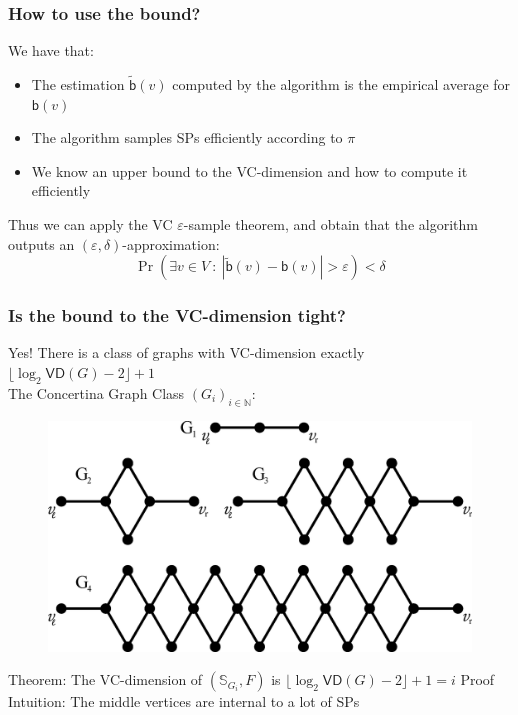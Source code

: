\documentclass[aspectratio=169]{beamer}
\newcommand*{\prob}{\pi\xspace}
\newcommand*{\betw}{\ensuremath{\mathsf{b}}\xspace}
\begin{document}
\begin{frame}
  \frametitle{How to use the bound?}
  We have that:
  \begin{itemize}
    \item The estimation $\tilde{\betw}(v)$ computed by the algorithm is the
      empirical average for $\betw(v)$
    \item The algorithm samples SPs efficiently according to $\prob$
    \item We know an upper bound to the VC-dimension and how to compute it
      efficiently
  \end{itemize}
  Thus we can apply the VC $\varepsilon$-sample theorem, and obtain that the algorithm
  outputs an $(\varepsilon,\delta)$-approximation:
  \[
    \Pr(\exists v\in V ~:~ |\tilde{\betw}(v)-\betw(v)|>\varepsilon)<\delta
  \]
\end{frame}

\begin{frame}
  \frametitle{Is the bound to the VC-dimension tight?}
  Yes! There is a class of graphs with VC-dimension exactly
  $\lfloor\log_2\mathsf{VD}(G) -2\rfloor +1$\\
  \quad The Concertina Graph Class $(G_i)_{i\in\mathbb{N}}$:
  \begin{figure}[H]
    \centering
    \includegraphics[scale=0.3]{figs/concertina}
  \end{figure}
  \vfill
  Theorem: The VC-dimension of $(\mathbb{S}_{G_i}, F)$ is
  $\lfloor\log_2\mathsf{VD}(G) -2\rfloor +1=i$
  \vfill
  Proof Intuition: The middle vertices are internal to a lot of SPs
\end{frame}
\end{document}
